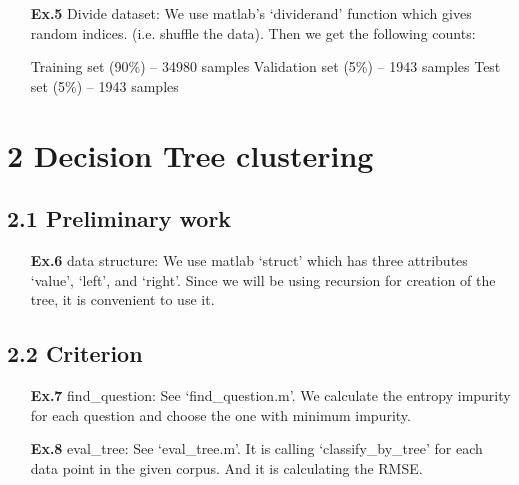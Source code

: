 \documentclass[a4paper]{article}
\begin{document}
\begin{enumerate}
	\item[ \textbf{Ex.5} ] Divide dataset: \newline
	We use matlab's `dividerand' function which gives random indices. (i.e. shuffle the data). Then we get the following counts: \newline
	\begin{tcolorbox}
       Training set (90\%) -- 34980 samples \newline
	   Validation set (5\%) -- 1943 samples \newline
	   Test set (5\%) -- 1943 samples
	\end{tcolorbox}
\end{enumerate}

\section*{2 Decision Tree clustering}
\subsection*{2.1 Preliminary work}

\begin{enumerate}
	\item[ \textbf{Ex.6} ] data structure: \newline
	We use matlab `struct' which has three attributes `value', `left', and `right'.
	Since we will be using recursion for creation of the tree, it is convenient to use it.
\end{enumerate}

\subsection*{2.2 Criterion}
\begin{enumerate}
	\item[ \textbf{Ex.7} ] find\_question: \newline
	   See `find\_question.m'. We calculate the entropy impurity for each question and choose the one with minimum impurity.
	   
	\item[ \textbf{Ex.8} ] eval\_tree: \newline
	 See `eval\_tree.m'. It is calling `classify\_by\_tree' for each data point in the given corpus. And it is calculating the RMSE.

\end{enumerate}
\end{document}

